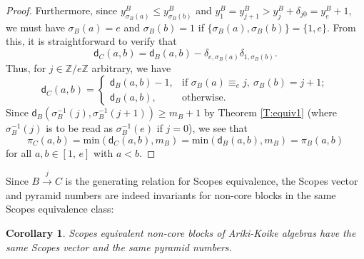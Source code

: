 \documentclass[11pt,a4paper,reqno]{amsart}
\numberwithin{equation}{section}
\theoremstyle{plain}
\newtheorem{cor}[thm]{Corollary}
\theoremstyle{definition}
\theoremstyle{remark}
\numberwithin{equation}{section}
\newcommand{\br}{\mathbf{r}}
\newcommand{\bz}{\mathbf{z}}
\renewcommand{\min}{\mathrm{min}}
\newcommand{\ZZ}{\mathbb{Z}}
\newcommand{\cs}{\mathsf{s}}
\newcommand{\DDot}[1]{\mathrel{\overset{#1}{\bullet}}}
\newcommand{\dd}{\mathsf{d}}
\begin{document}
\begin{proof}
Furthermore, since $y^B_{\sigma_B(a)} \leq y^B_{\sigma_B(b)}$ and $y^B_1 = y^B_{j+1} > y^B_j + \delta_{j0} = y^B_e + 1$, we must have $\sigma_B(a) = e$ and $\sigma_B(b) = 1$ if $\{\sigma_B(a),\sigma_B(b)\} = \{1,e\}$.
From this, it is straightforward to verify that
$$
\dd_{C}(a,b) = \dd_B(a,b) - \delta_{e,\sigma_B(a)}\delta_{1,\sigma_B(b)}.
$$
Thus, for $j \in \ZZ/e\ZZ$ arbitrary, we have
$$
\dd_C(a,b) =
\begin{cases}
\dd_B(a,b) - 1, &\text{if } \sigma_B(a) \equiv_e j,\ \sigma_B(b) = j+1; \\
\dd_B(a,b), &\text{otherwise.}
\end{cases}
$$
Since $\dd_B(\sigma_B^{-1}(j),\sigma_B^{-1}(j+1)) \geq m_B+1$ by Theorem \ref{T:equiv1} (where $\sigma_B^{-1}(j)$ is to be read as $\sigma_B^{-1}(e)$ if $j =0$), we see that
$$
\pi_{C}(a,b) = \min(\dd_{C}(a,b), m_B) = \min(\dd_B(a,b), m_B) = \pi_B(a,b)
$$
for all $a,b \in [1,\,e]$ with $a < b$.
\end{proof}

Since $B \xrightarrow{j} C$ is the generating relation for Scopes equivalence, the Scopes vector and pyramid numbers are indeed invariants for non-core blocks in the same Scopes equivalence class:

\begin{cor} \label{C:Scopes}
Scopes equivalent non-core blocks of Ariki-Koike algebras have the same Scopes vector and the same pyramid numbers.
\end{cor}

\end{document}
